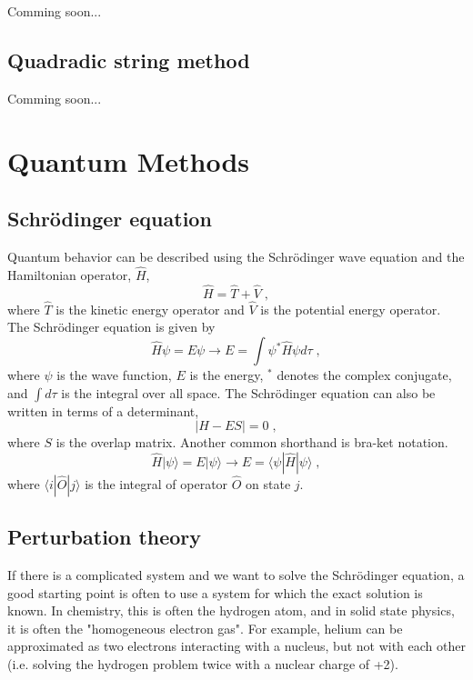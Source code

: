 \documentclass[12pt]{report}
\begin{document}
{\color{red}Comming soon...}

\subsection{Quadradic string method}

{\color{red}Comming soon...}

\section{Quantum Methods}

\subsection{Schr\"{o}dinger equation}

Quantum behavior can be described using the Schr\"{o}dinger wave equation and
the Hamiltonian operator, $\hat H$,
\begin{equation}
 \hat H = \hat T + \hat V \; ,
\end{equation}
where $\hat T$ is the kinetic energy operator and $\hat V$ is the potential
energy operator. The Schr\"{o}dinger equation is given by
\begin{equation}
 \hat H\psi = E\psi \to E = \int \psi^*\hat H\psi d\tau \; ,
\end{equation}
where $\psi$ is the wave function, $E$ is the energy, $^*$ denotes the complex
conjugate, and $\int d\tau$ is the integral over all space. The
Schr\"{o}dinger equation can also be written in terms of a determinant,
\begin{equation}
 |H-ES| = 0 \; ,
\end{equation}
where $S$ is the overlap matrix. Another common shorthand is bra-ket notation.
\begin{equation}
 \hat H|\psi\rangle = E|\psi\rangle \to E=\langle\psi|\hat H|\psi\rangle \; ,
\end{equation}
where $\langle i|\hat O|j\rangle$ is the integral of operator $\hat O$ on
state $j$.

\subsection{Perturbation theory}

If there is a complicated system and we want to solve the Schr\"{o}dinger 
equation, a good starting point is often to use a system for which the exact
solution is known. In chemistry, this is often the hydrogen atom, and in solid
state physics, it is often the "homogeneous electron gas". For example, helium
can be approximated as two electrons interacting with a nucleus, but not with
each other (i.e. solving the hydrogen problem twice with a nuclear charge of
+2). \\
\end{document}
